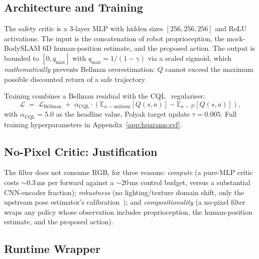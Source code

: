\documentclass[11pt,a4paper]{report}
\newcommand{\bodyslampp}{BodySLAM\nolinebreak[4]\hspace{-.05em}\raisebox{.2ex}{\scriptsize ++}}
\begin{document}
\subsection{Architecture and Training}
\label{sec:method:filter:arch}

The safety critic is a 3-layer MLP with hidden sizes
$[256, 256, 256]$ and ReLU activations. The input is the
concatenation of robot proprioception, the mock-\bodyslampp{} 6D
human-position estimate, and the proposed action. The output is
bounded to $[0, q_{\max}]$ with $q_{\max} = 1/(1-\gamma)$ via a
scaled sigmoid, which \emph{mathematically} prevents Bellman
overestimation: $Q$ cannot exceed the maximum possible discounted
return of a safe trajectory.

Training combines a Bellman residual with the
\textsc{CQL}~\cite{kumar2020cql} regulariser:
\begin{equation}
  \mathcal{L} \;=\; \mathcal{L}_{\mathrm{Bellman}}
  \;+\; \alpha_{\mathrm{CQL}} \cdot
  \left(\mathbb{E}_{a \sim \mathrm{uniform}}\!\left[Q(s,a)\right]
       - \mathbb{E}_{a \sim \mathcal{D}}\!\left[Q(s,a)\right]\right),
  \label{eq:cql-loss}
\end{equation}
with $\alpha_{\mathrm{CQL}} = 5.0$ as the headline value, Polyak
target update $\tau = 0.005$. Full training hyperparameters in
Appendix~\ref{app:hparams:svf}.

\subsection{No-Pixel Critic: Justification}
\label{sec:method:filter:nopixels}

The filter does not consume RGB, for three reasons: \emph{compute}
(a pure-MLP critic costs $\sim$0.3\,ms per forward against a
$\sim$20\,ms control budget, versus a substantial CNN-encoder
fraction); \emph{robustness} (no lighting/texture domain shift, only
the upstream pose estimator's
calibration~\cite{henning2023bodyslampp}); and
\emph{compositionality} (a no-pixel filter wraps any policy whose
observation includes proprioception, the human-position estimate,
and the proposed action).

\subsection{Runtime Wrapper}
\label{sec:method:filter:runtime}
\end{document}
